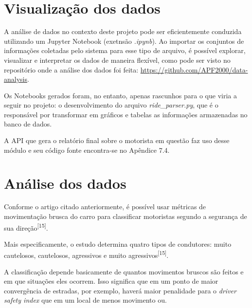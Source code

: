 \section{Visualização dos dados}
A análise de dados no contexto deste projeto pode ser eficientemente conduzida utilizando um Jupyter Notebook (exetnsão \textit{.ipynb}). Ao importar os conjuntos de informações coletadas pelo sistema para esse tipo de arquivo, é possível explorar, visualizar e interpretar os dados de maneira flexível, como pode ser visto no repositório onde a análise dos dados foi feita: \url{https://github.com/APF2000/data-analysis}. 


Os Notebooks gerados foram, no entanto, apenas rascunhos para o que viria a seguir no projeto: o desenvolvimento do arquivo \textit{ride\_parser.py}, que é o responsável por transformar em gráficos e tabelas as informações armazenadas no banco de dados.

A API que gera o relatório final sobre o motorista em questão faz uso desse módulo e seu código fonte encontra-se no Apêndice 7.4.


\section{Análise dos dados}
Conforme o artigo citado anteriormente, é possível usar métricas de movimentação brusca do carro para classificar motoristas segundo a segurança de sua direção\textsuperscript{[15]}.

Mais especificamente, o estudo determina quatro tipos de condutores: muito cautelosos, cautelosos, agressivos e muito agressivos\textsuperscript{[15]}.

A classificação depende basicamente de quantos movimentos bruscos são feitos e em que situações eles ocorrem. Isso significa que em um ponto de maior convergência de estradas, por exemplo, haverá maior penalidade para o \textit{driver safety index} que em um local de menos movimento ou.

